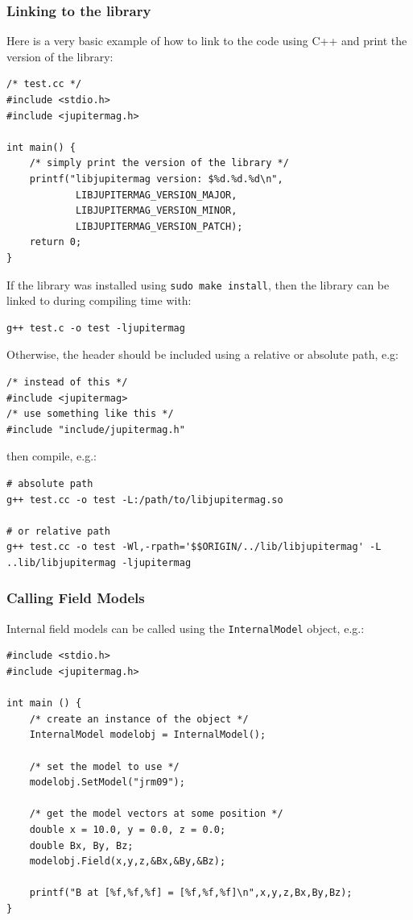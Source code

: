 	\subsubsection{Linking to the library}
	
		Here is a very basic example of how to link to the code using C++ and print the version of the library:
	
		\begin{verbatim}
/* test.cc */
#include <stdio.h>
#include <jupitermag.h>
	
int main() {
	/* simply print the version of the library */
	printf("libjupitermag version: $%d.%d.%d\n",
			LIBJUPITERMAG_VERSION_MAJOR,
			LIBJUPITERMAG_VERSION_MINOR,
			LIBJUPITERMAG_VERSION_PATCH);
	return 0;
} 
		\end{verbatim}
	
		If the library was installed using \texttt{sudo make install}, then the library can be linked to during compiling time with:
	
		\begin{verbatim}
g++ test.c -o test -ljupitermag
		\end{verbatim}
	
		Otherwise, the header should be included using a relative or absolute path, e.g:
	
		\begin{verbatim}
/* instead of this */
#include <jupitermag>
/* use something like this */
#include "include/jupitermag.h"
		\end{verbatim}
	
		then compile, e.g.:
	
		\begin{verbatim}
# absolute path
g++ test.cc -o test -L:/path/to/libjupitermag.so
	
# or relative path
g++ test.cc -o test -Wl,-rpath='$$ORIGIN/../lib/libjupitermag' -L ..lib/libjupitermag -ljupitermag
		\end{verbatim}
	
	\subsubsection{Calling Field Models}
	
		Internal field models can be called using the \texttt{InternalModel} object, e.g.:
	
		\begin{verbatim}
#include <stdio.h>
#include <jupitermag.h>
	
int main () {
	/* create an instance of the object */
	InternalModel modelobj = InternalModel();
	
	/* set the model to use */
	modelobj.SetModel("jrm09");
	
	/* get the model vectors at some position */
	double x = 10.0, y = 0.0, z = 0.0;
	double Bx, By, Bz;
	modelobj.Field(x,y,z,&Bx,&By,&Bz);

	printf("B at [%f,%f,%f] = [%f,%f,%f]\n",x,y,z,Bx,By,Bz);
}
		\end{verbatim}
	
